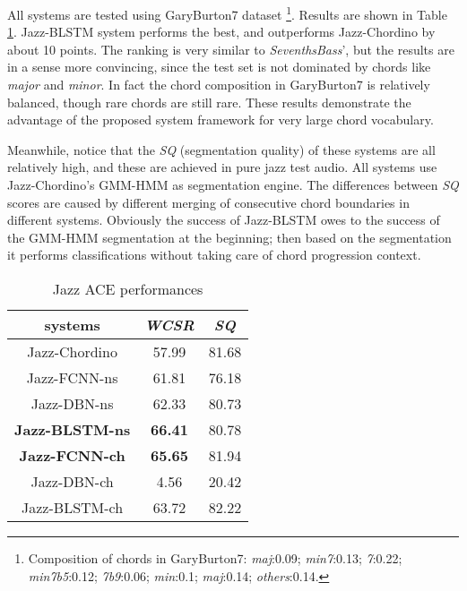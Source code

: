 All systems are tested using GaryBurton7 dataset \footnote{Composition of chords in GaryBurton7: \textit{maj}:0.09; \textit{min7}:0.13; \textit{7}:0.22; \textit{min7b5}:0.12; \textit{7b9}:0.06; \textit{min}:0.1; \textit{maj}:0.14; \textit{others}:0.14.}. Results are shown in Table \ref{tab:5-jazz-wcsr}. Jazz-BLSTM system performs the best, and outperforms Jazz-Chordino by about 10 points. The ranking is very similar to \textit{SeventhsBass}', but the results are in a sense more convincing, since the test set is not dominated by chords like \textit{major} and \textit{minor}. In fact the chord composition in GaryBurton7 is relatively balanced, though rare chords are still rare. These results demonstrate the advantage of the proposed system framework for very large chord vocabulary.

Meanwhile, notice that the \textit{SQ} (segmentation quality) of these systems are all relatively high, and these are achieved in pure jazz test audio. All systems use Jazz-Chordino's GMM-HMM as segmentation engine. The differences between \textit{SQ} scores are caused by different merging of consecutive chord boundaries in different systems. Obviously the success of Jazz-BLSTM owes to the success of the GMM-HMM segmentation at the beginning; then based on the segmentation it performs classifications without taking care of chord progression context.

\begin{table}[t]
\centering
\footnotesize
\begin{tabular}{|c|c|c|} \hline
systems & \textit{WCSR} & \textit{SQ}\\ \hline
Jazz-Chordino & 57.99 & 81.68\\ \hline
Jazz-FCNN-ns & 61.81& 76.18\\ \hline
Jazz-DBN-ns & 62.33& 80.73\\ \hline
\textbf{Jazz-BLSTM-ns} & \textbf{66.41} & 80.78\\ \hline
\textbf{Jazz-FCNN-ch} & \textbf{65.65} & 81.94\\ \hline
Jazz-DBN-ch & 4.56& 20.42\\ \hline
Jazz-BLSTM-ch & 63.72 & 82.22\\ \hline
\end{tabular}
\caption{Jazz ACE performances}
\label{tab:5-jazz-wcsr}
\end{table}

